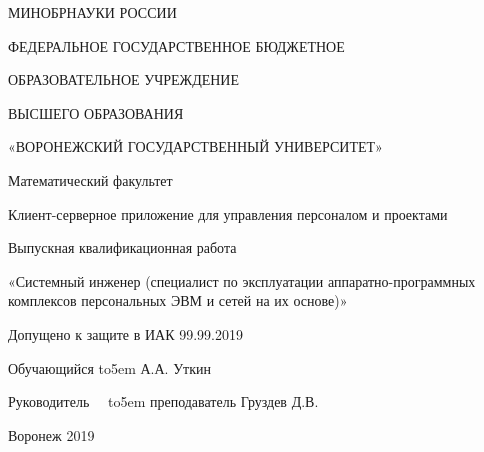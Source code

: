 \documentclass[14pt,a4paper,openbib]{extarticle}
\numberwithin{equation}{section}
\begin{document}
\begin{titlepage}
\begin{center}
МИНОБРНАУКИ РОССИИ

ФЕДЕРАЛЬНОЕ ГОСУДАРСТВЕННОЕ БЮДЖЕТНОЕ

ОБРАЗОВАТЕЛЬНОЕ УЧРЕЖДЕНИЕ

ВЫСШЕГО ОБРАЗОВАНИЯ

«ВОРОНЕЖСКИЙ ГОСУДАРСТВЕННЫЙ УНИВЕРСИТЕТ»

\begin{spacing}{4}
\end{spacing}

Математический факультет
\begin{spacing}{5.5}
\end{spacing}


Клиент-серверное приложение для управления персоналом и проектами
\begin{spacing}{4.5}
\end{spacing}


Выпускная квалификационная работа 

«Системный инженер (специалист по эксплуатации аппаратно-программных комплексов персональных ЭВМ и сетей на их основе)»

   \end{center}

   \begin{spacing}{5.5}
\end{spacing}

Допущено к защите в ИАК	 99.99.2019

\begin{spacing}{2}
\end{spacing}

\begin{spacing}{2}
\end{spacing}
Обучающийся \def\hrf#1{\hbox to#1{\hrulefill}}
\hrf{5em} А.А. Уткин
\begin{spacing}{2}
\end{spacing}
Руководитель\ \ \def\hrf#1{\hbox to#1{\hrulefill}}
\hrf{5em}
		 преподаватель Груздев Д.В.

\begin{center}
\begin{spacing}{4}
\end{spacing}
Воронеж 2019
   \end{center}

\end{titlepage}
\renewcommand\contentsname{Оглавление} %
\tableofcontents
\setcounter{page}{2}
\end{document}
